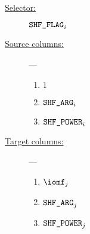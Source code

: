 \begin{description}
	\item[\underline{Selector:}] $\texttt{SHF\_FLAG} _{i}$
	\item[\underline{Source columns:}] ---
		\begin{multicols}{2}
			\begin{enumerate}
				\item $1$
				\item $\texttt{SHF\_ARG}   _{i}$
				\item $\texttt{SHF\_POWER} _{i}$
			\end{enumerate}
		\end{multicols}
	\item[\underline{Target columns:}] ---
		\begin{multicols}{2}
			\begin{enumerate}
				\item $\iomf     _{j}$
				\item $\texttt{SHF\_ARG}   _{j}$
				\item $\texttt{SHF\_POWER} _{j}$
			\end{enumerate}
		\end{multicols}
\end{description}
